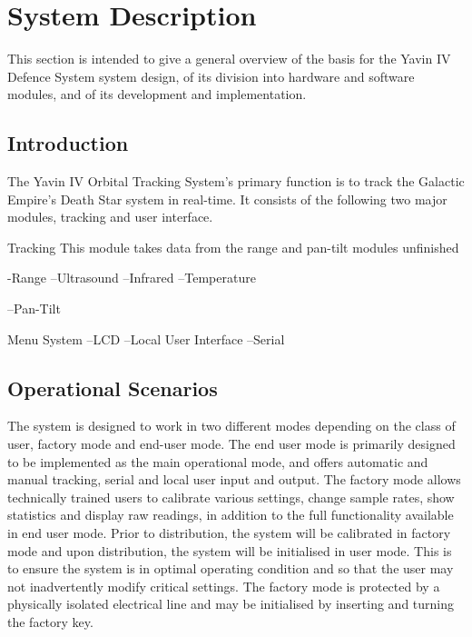 \documentclass[]{report}
\begin{document}
\chapter{System Description}
This section is intended to give a general overview of the basis for the Yavin IV Defence System system design, of its division into hardware and software modules, and of its development and implementation.

\section{Introduction}

The Yavin IV Orbital Tracking System's primary function is to track the Galactic Empire's Death Star system in real-time.
It consists of the following two major modules, tracking and user interface.


Tracking
This module takes data from the range and pan-tilt modules
unfinished

-Range
--Ultrasound
--Infrared
--Temperature

--Pan-Tilt

Menu System
--LCD
--Local User Interface
--Serial

\section{Operational Scenarios}

The system is designed to work in two different modes depending on the class of user, factory mode and end-user mode.\newline
The end user mode is primarily designed to be implemented as the main operational mode, and offers automatic and manual tracking, serial and local user input and output. The factory mode allows technically trained users to calibrate various settings, change sample rates, show statistics and display raw readings, in addition to the full functionality available in end user mode.\newline
Prior to distribution, the system will be calibrated in factory mode and upon distribution, the system will be initialised in user mode. This is to ensure the system is in optimal operating condition and so that the user may not inadvertently modify critical settings. \newline
The factory mode is protected by a physically isolated electrical line and may be initialised by inserting and turning the factory key.
\end{document}

